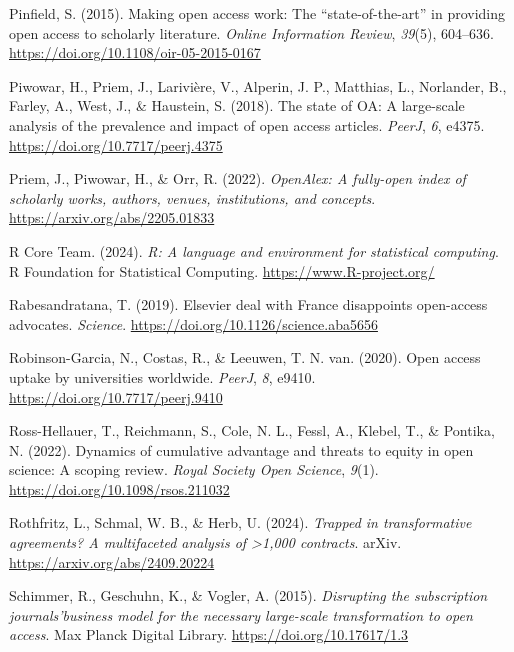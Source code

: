 \documentclass[a4paper,man,floatsintext,longtable,noextraspace,10pt]{apa6}
\newlength{\cslhangindent}
\newenvironment{CSLReferences}[2] %
{\begin{list}{}{%
  \setlength{\itemindent}{0pt}
  \setlength{\leftmargin}{0pt}
  \setlength{\parsep}{0pt}
  \ifodd #1
  \setlength{\leftmargin}{\cslhangindent}
  \setlength{\itemindent}{-1\cslhangindent}
  \fi
  \setlength{\itemsep}{#2\baselineskip}}}
{\end{list}}
\begin{document}
\begin{CSLReferences}{1}{0}
Pinfield, S. (2015). Making open access work: The {``state-of-the-art''}
in providing open access to scholarly literature. \emph{Online
Information Review}, \emph{39}(5), 604--636.
\url{https://doi.org/10.1108/oir-05-2015-0167}

Piwowar, H., Priem, J., Larivière, V., Alperin, J. P., Matthias, L.,
Norlander, B., Farley, A., West, J., \& Haustein, S. (2018). The state
of {OA}: A large-scale analysis of the prevalence and impact of open
access articles. \emph{{PeerJ}}, \emph{6}, e4375.
\url{https://doi.org/10.7717/peerj.4375}

Priem, J., Piwowar, H., \& Orr, R. (2022). \emph{OpenAlex: A fully-open
index of scholarly works, authors, venues, institutions, and concepts}.
\url{https://arxiv.org/abs/2205.01833}

R Core Team. (2024). \emph{R: A language and environment for statistical
computing}. R Foundation for Statistical Computing.
\url{https://www.R-project.org/}

Rabesandratana, T. (2019). Elsevier deal with {France} disappoints
open-access advocates. \emph{Science}.
\url{https://doi.org/10.1126/science.aba5656}

Robinson-Garcia, N., Costas, R., \& Leeuwen, T. N. van. (2020). Open
access uptake by universities worldwide. \emph{{PeerJ}}, \emph{8},
e9410. \url{https://doi.org/10.7717/peerj.9410}

Ross-Hellauer, T., Reichmann, S., Cole, N. L., Fessl, A., Klebel, T., \&
Pontika, N. (2022). Dynamics of cumulative advantage and threats to
equity in open science: A scoping review. \emph{Royal Society Open
Science}, \emph{9}(1). \url{https://doi.org/10.1098/rsos.211032}

Rothfritz, L., Schmal, W. B., \& Herb, U. (2024). \emph{Trapped in
transformative agreements? A multifaceted analysis of \textgreater1,000
contracts}. arXiv. \url{https://arxiv.org/abs/2409.20224}

Schimmer, R., Geschuhn, K., \& Vogler, A. (2015). \emph{{Disrupting the
subscription journals'business model for the necessary large-scale
transformation to open access}}. Max Planck Digital Library.
\url{https://doi.org/10.17617/1.3}


\end{CSLReferences}
\end{document}
